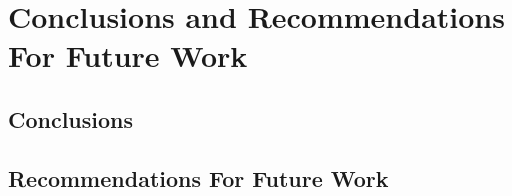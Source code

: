 \chapter{Conclusions and Recommendations For Future Work}
\section{Conclusions}
\section{Recommendations For Future Work}
\newpage